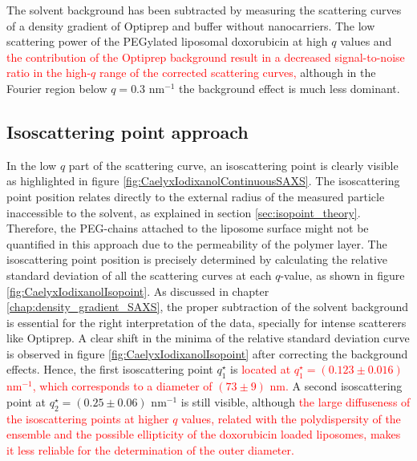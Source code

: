 The solvent background has been subtracted by measuring the scattering curves of a density gradient of Optiprep and buffer without nanocarriers. The low scattering power of the PEGylated liposomal doxorubicin at high $q$ values and \textcolor{red}{the contribution of the Optiprep background result in a decreased signal-to-noise ratio in the high-$q$ range of the corrected scattering curves,} although in the Fourier region below $q = 0.3$ nm$^{-1}$ the background effect is much less dominant.

\subsection{Isoscattering point approach}
In the low $q$ part of the scattering curve, an isoscattering point is clearly visible as highlighted in figure \ref{fig:CaelyxIodixanolContinuousSAXS}. The isoscattering point position relates directly to the external radius of the measured particle inaccessible to the solvent, as explained in section \ref{sec:isopoint_theory}. Therefore, the PEG-chains attached to the liposome surface might not be quantified in this approach due to the permeability of the polymer layer. The isoscattering point position is precisely determined by calculating the relative standard deviation of all the scattering curves at each $q$-value, as shown in figure \ref{fig:CaelyxIodixanolIsopoint}. As discussed in chapter \ref{chap:density_gradient_SAXS}, the proper subtraction of the solvent background is essential for the right interpretation of the data, specially for intense scatterers like Optiprep. A clear shift in the minima of the relative standard deviation curve is observed in figure \ref{fig:CaelyxIodixanolIsopoint} after correcting the background effects. Hence, the first isoscattering point $q^{\star}_1$ is \textcolor{red}{located at $q^{\star}_1 = \left(0.123\pm0.016\right)$ nm$^{-1}$, which corresponds to a diameter of $\left( 73 \pm 9 \right)$ nm.} A second isoscattering point at $q^{\star}_2 = \left(0.25\pm0.06\right)$ nm$^{-1}$ is still visible, although \textcolor{red}{the large diffuseness of the isoscattering points at higher $q$ values, related with the polydispersity of the ensemble and the possible ellipticity of the doxorubicin loaded liposomes, makes it less reliable for the determination of the outer diameter.}


